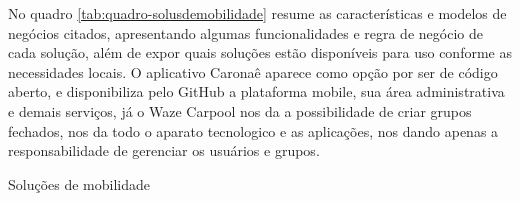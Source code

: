 No quadro \ref{tab:quadro-solusdemobilidade} resume as características e modelos de negócios citados, apresentando algumas funcionalidades e regra de negócio de cada solução, além de expor quais soluções estão disponíveis para uso conforme as necessidades locais. O aplicativo Caronaê aparece como opção por ser de código aberto, e disponibiliza pelo GitHub a plataforma mobile, sua área administrativa e demais serviços, já o Waze Carpool nos da a possibilidade de criar grupos fechados, nos da todo o aparato tecnologico e as aplicações, nos dando apenas a responsabilidade de gerenciar os usuários e grupos. 
\begin{landscape}
\begin{quadro}[]
\caption{Soluções de mobilidade}
\label{tab:quadro-solusdemobilidade}
\end{quadro}
\end{landscape}

